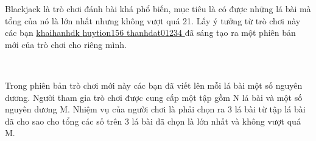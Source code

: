 Blackjack là trò chơi đánh bài khá phổ biến, mục tiêu là có được những lá bài mà tổng của nó là lớn nhất nhưng không vượt quá 21. Lấy ý tưởng từ trò chơi này các bạn \href{http://vnoi.info/index.php?option=com_voj2&amp;page=user&amp;user=khaihanhdk}{ khaihanhdk }\href{http://vnoi.info/index.php?option=com_voj2&amp;page=user&amp;user=huytion156}{ huytion156 }\href{http://vnoi.info/index.php?option=com_voj2&amp;page=user&amp;user=thanhdat01234}{ thanhdat01234 } đã sáng tạo ra một phiên bản mới của trò chơi cho riêng mình.

 

Trong phiên bản trò chơi mới này các bạn đã viết lên mỗi lá bài một số nguyên dương. Người tham gia trò chơi được cung cấp một tập gồm N lá bài và một số nguyên dương M. Nhiệm vụ của người chơi là phải chọn ra 3 lá bài từ tập lá bài đã cho sao cho tổng các số trên 3 lá bài đã chọn là lớn nhất và không vượt quá M.